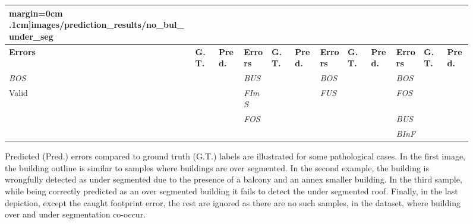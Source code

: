 \documentclass[runningheads]{llncs}
\newcommand{\cmark}{{\color{green} \ding{51}}}%
\newcommand{\xmark}{{\color{red} \ding{55}}}%
\begin{document}
\begin{figure}
\begin{center}
\begin{tabular}{| x{1.11cm} | x{.75cm} | x{.75cm} || x{1.11cm} | x{.75cm} | x{.75cm} || x{1.11cm} | x{.75cm} | x{.75cm} || x{1.11cm} | x{.75cm} | x{.75cm} |}
margin=0cm .1cm]{images/prediction_results/no_bul_under_seg}} \\
			\hline
			\textbf{Errors} & \textbf{G.T.} & \textbf{Pred.} & \textbf{Errors} & \textbf{G.T.} & \textbf{Pred.} & \textbf{Errors} & \textbf{G.T.} & \textbf{Pred.} & \textbf{Errors} & \textbf{G.T.} & \textbf{Pred.}\\
            \hline
            \textit{BOS} & \xmark & \cmark & \textit{BUS} & \xmark & \cmark & \textit{BOS} & \cmark & \cmark & \textit{BOS} & \cmark & \xmark \\
            Valid & \cmark & \xmark & \textit{FImS} & \cmark & \xmark & \textit{FUS} & \cmark & \xmark &  \textit{FOS} & \cmark & \xmark \\
             &  &  & \textit{FOS} & \cmark & \xmark &  &  &  & \textit{BUS} & \cmark & \xmark \\
             &  &  &  &  &  &  &  &  &  \textit{BInF} & \cmark & \cmark \\
            \hline
		\end{tabular}
        \caption{\label{fig::results} Predicted (Pred.) errors compared to ground truth (G.T.) labels are illustrated for some pathological cases. In the first image, the building outline is similar to samples where buildings are over segmented. In the second example, the building is wrongfully detected as under segmented due to the presence of a balcony and an annex smaller building. In the third sample, while being correctly predicted as an over segmented building it fails to detect the under segmented roof. Finally, in the last depiction, except the caught footprint error, the rest are ignored as there are no such samples, in the dataset, where building over and under segmentation co-occur.}
	\end{center}
\end{figure}
\end{document}
